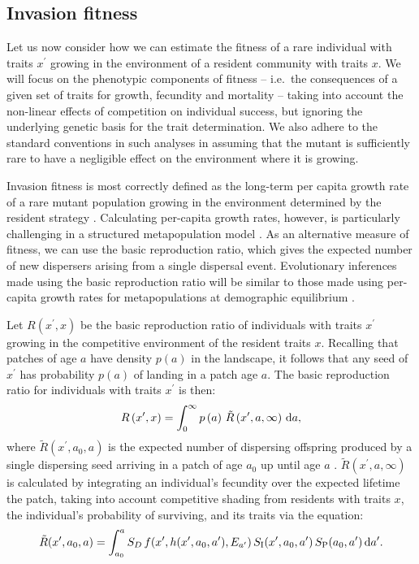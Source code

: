\documentclass[10pt,twoside]{article}
\begin{document}
\subsection{Invasion fitness}\label{invasion-fitness}

Let us now consider how we can estimate the fitness of a rare individual
with traits \(x^\prime\) growing in the environment of a resident
community with traits \(x\). We will focus on the phenotypic components
of fitness -- i.e.~the consequences of a given set of traits for growth,
fecundity and mortality -- taking into account the non-linear effects of
competition on individual success, but ignoring the underlying genetic
basis for the trait determination. We also adhere to the standard
conventions in such analyses in assuming that the mutant is sufficiently
rare to have a negligible effect on the environment where it is growing.

Invasion fitness is most correctly defined as the long-term per capita
growth rate of a rare mutant population growing in the environment
determined by the resident strategy \citep{Metz-1992}. Calculating
per-capita growth rates, however, is particularly challenging in a
structured metapopulation model \citep{Gyllenberg-2001, Metz-2001}. As
an alternative measure of fitness, we can use the basic reproduction
ratio, which gives the expected number of new dispersers arising from a
single dispersal event. Evolutionary inferences made using the basic
reproduction ratio will be similar to those made using per-capita growth
rates for metapopulations at demographic equilibrium
\citep{Gyllenberg-2001, Metz-2001}.

Let \(R\left(x^\prime,x\right)\) be the basic reproduction ratio of
individuals with traits \(x^\prime\) growing in the competitive
environment of the resident traits \(x\). Recalling that patches of age
\(a\) have density \(p(a)\) in the landscape, it follows that any seed
of \(x^\prime\) has probability \(p(a)\) of landing in a patch age
\(a\). The basic reproduction ratio for individuals with traits
\(x^\prime\) is then:
\begin{equation} \label{eq:InvFit}
  R\left(x^\prime,x\right)=\int _0^{\infty }p\left(a\right) \, \tilde{R}\left(x^\prime,a, \infty \right)\, {\rm d}a ,
\end{equation}
where \(\tilde{R}\left(x^\prime,a_0,a \right)\) is the expected number
of dispersing offspring produced by a single dispersing seed arriving in
a patch of age \(a_0\) up until age \(a\)
\citep{Gyllenberg-2001, Metz-2001}.
\(\tilde{R}\left(x^\prime,a,\infty\right)\) is calculated by integrating
an individual's fecundity over the expected lifetime the patch, taking
into account competitive shading from residents with traits \(x\), the
individual's probability of surviving, and its traits via the equation:
\begin{equation} \label{eq:tildeR}
  \tilde{R}(x^\prime, a_0, a) =\int_{a_0}^{a}  S_D \, f(x^\prime, h(x^\prime, a_0, a^\prime), E_{a^\prime}) \, S_{\rm I} (x^\prime, a_0, a^\prime) \, S_{\rm P} (a_0,a^\prime) \,  {\rm d} a^\prime.
\end{equation}
\end{document}
